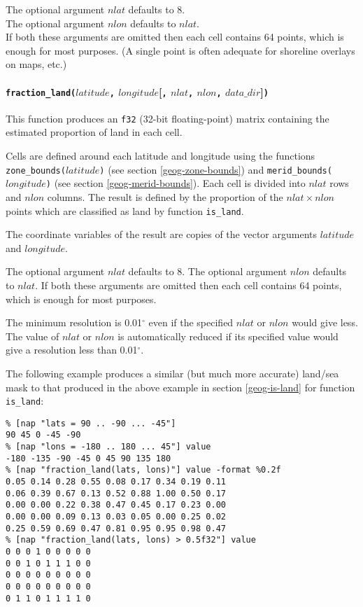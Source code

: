  The optional argument 
  $nlat$ defaults to 8.
  \\The optional argument 
  $nlon$ defaults to 
  $nlat$.
  \\If both these arguments are omitted then each cell contains 64
  points, which is enough for most purposes. (A single point is often
  adequate for shoreline overlays on maps, etc.)

\paragraph{\texttt{fraction\_land(}$latitude$\texttt{,}
$longitude$[\texttt{,} $nlat$\texttt{,} $nlon$\texttt{,} $data\_dir$]\texttt{)}\\}
    \label{geog-fraction-land} 

This function produces an 
  \texttt{f32} (32-bit floating-point) matrix containing the
  estimated proportion of land in each cell.

Cells are defined around each latitude and longitude using the functions 
\texttt{zone\_bounds(}$latitude$\texttt{)} (see section  \ref{geog-zone-bounds}) and
\texttt{merid\_bounds(}$longitude$\texttt{)} (see section  \ref{geog-merid-bounds}).
Each cell is divided into $nlat$ rows and $nlon$ columns.
The result is defined by the proportion of the 
$nlat \times nlon$ points which are classified as land by function \texttt{is\_land}.
  
 The coordinate variables of the result are copies of the vector
  arguments 
  $latitude$ and 
  $longitude$.
  
The optional argument $nlat$ defaults to 8.
The optional argument $nlon$ defaults to $nlat$.
If both these arguments are omitted then each cell contains 64
  points, which is enough for most purposes.

The minimum resolution is 0.01$^{\circ}$ even if the specified 
  $nlat$ or 
  $nlon$ would give less. The value of 
  $nlat$ or 
  $nlon$ is automatically reduced if its specified value would
  give a resolution less than 0.01$^{\circ}$.

The following example produces a similar (but much more accurate)
land/sea mask to that produced in the above example 
in section  \ref{geog-is-land} for function \texttt{is\_land}:
\begin{verbatim}
% [nap "lats = 90 .. -90 ... -45"]
90 45 0 -45 -90
% [nap "lons = -180 .. 180 ... 45"] value
-180 -135 -90 -45 0 45 90 135 180
% [nap "fraction_land(lats, lons)"] value -format %0.2f
0.05 0.14 0.28 0.55 0.08 0.17 0.34 0.19 0.11
0.06 0.39 0.67 0.13 0.52 0.88 1.00 0.50 0.17
0.00 0.00 0.22 0.38 0.47 0.45 0.17 0.23 0.00
0.00 0.00 0.09 0.13 0.03 0.05 0.00 0.25 0.02
0.25 0.59 0.69 0.47 0.81 0.95 0.95 0.98 0.47
% [nap "fraction_land(lats, lons) > 0.5f32"] value
0 0 0 1 0 0 0 0 0
0 0 1 0 1 1 1 0 0
0 0 0 0 0 0 0 0 0
0 0 0 0 0 0 0 0 0
0 1 1 0 1 1 1 1 0
\end{verbatim}

